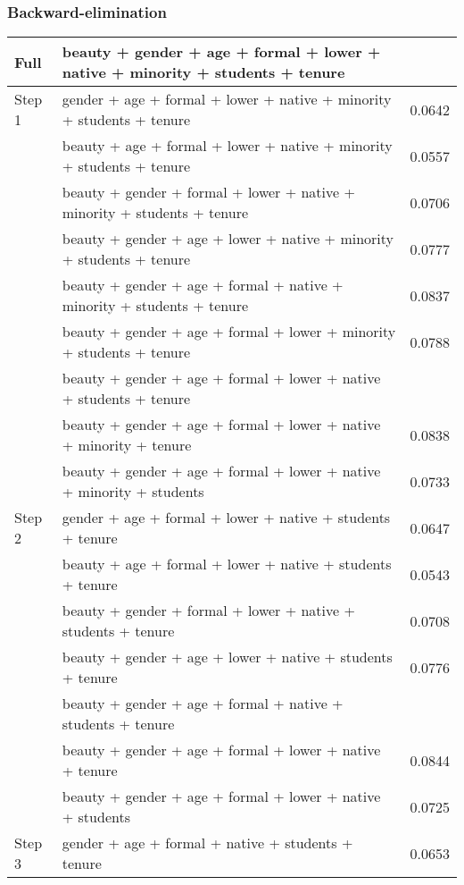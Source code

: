 \begin{frame}[shrink]
\frametitle{Backward-elimination}

\vspace{-0.3cm}

{\tiny
\begin{tabular}{l | l | c}
Full		& beauty + gender + age + formal + lower + native + minority + students + tenure & \orange{0.0839} \pause \\
\hline
Step 1 	& gender + age + formal + lower + native + minority + students + tenure		& 0.0642 \\
		& beauty + age + formal + lower + native + minority + students + tenure		& 0.0557 \\
		& beauty + gender + formal + lower + native + minority + students + tenure	& 0.0706 \\
		& beauty + gender + age + lower + native + minority + students + tenure		& 0.0777 \\
		& beauty + gender + age + formal + native + minority + students + tenure		& 0.0837 \\
		& beauty + gender + age + formal + lower + minority + students + tenure		& 0.0788 \\
		& beauty + gender + age + formal + lower + native + students + tenure		& \orange{0.0842} \\
		& beauty + gender + age + formal + lower + native + minority + tenure		& 0.0838 \\
		& beauty + gender + age + formal + lower + native + minority + students		& 0.0733 \pause \\
\hline		
Step 2	& gender + age + formal + lower + native + students + tenure 				& 0.0647 \\
		& beauty + age + formal + lower + native + students + tenure 				& 0.0543 \\
		& beauty + gender + formal + lower + native + students + tenure 			& 0.0708 \\
		& beauty + gender + age + lower + native + students + tenure 				&0.0776  \\
		& beauty + gender + age + formal + native + students + tenure 			& \orange{0.0846} \\
		& beauty + gender + age + formal + lower + native + tenure 				& 0.0844 \\
		& beauty + gender + age + formal + lower + native + students 				& 0.0725 \pause \\
\hline
Step 3	& gender + age + formal + native + students + tenure 					& 0.0653 \\

\end{tabular}}
\end{frame}

